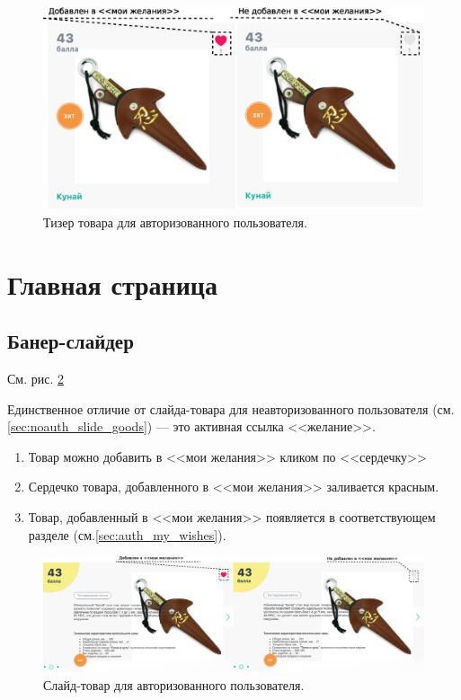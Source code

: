         
            \begin{figure}
                \center
                \includegraphics[width=170mm]{04_auth_funcs/figures/03.eps}
                \caption{Тизер товара для авторизованного пользователя.}
                \label{fig:auth_tizer}
            \end{figure}
        
        
    \section{Главная страница}
        \subsection{Банер-слайдер}
        
            См. рис. \ref{fig:auth_slide_goods}

            Единственное отличие от слайда-товара для неавторизованного 
            пользователя (см. \ref{sec:noauth_slide_goods})
            --- это активная ссылка <<желание>>.
            
            \begin{enumerate}
                \item Товар можно добавить в <<мои желания>> кликом по 
                <<сердечку>>
                \item Сердечко товара, добавленного в <<мои желания>> 
                заливается красным.
                \item Товар, добавленный в <<мои желания>> появляется в 
                соответствующем разделе (см.\ref{sec:auth_my_wishes}).
            \end{enumerate}
            
            \begin{figure}
                \center
                \includegraphics[width=170mm]{04_auth_funcs/figures/04.eps}
                \caption{Слайд-товар для авторизованного пользователя.}
                \label{fig:auth_slide_goods}
            \end{figure}
        
